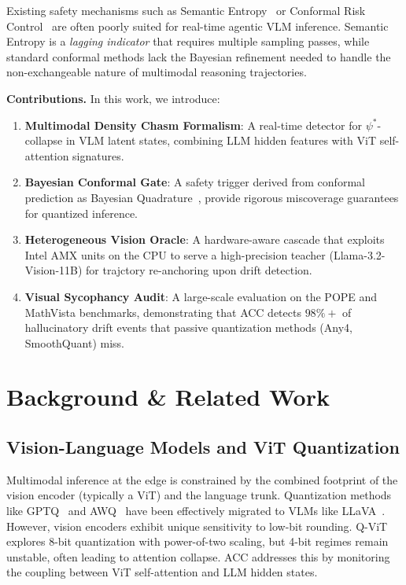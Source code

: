 \documentclass[runningheads]{article} %
\begin{document}
Existing safety mechanisms such as Semantic Entropy~\cite{kuhn2023semantic} or Conformal Risk Control~\cite{angelopoulos2024crc} are often poorly suited for real-time agentic VLM inference. Semantic Entropy is a \emph{lagging indicator} that requires multiple sampling passes, while standard conformal methods lack the Bayesian refinement needed to handle the non-exchangeable nature of multimodal reasoning trajectories.

\textbf{Contributions.} In this work, we introduce:
\begin{enumerate}
  \item \textbf{Multimodal Density Chasm Formalism}: A real-time detector for $\psi^*$-collapse in VLM latent states, combining LLM hidden features with ViT self-attention signatures.
  \item \textbf{Bayesian Conformal Gate}: A safety trigger derived from conformal prediction as Bayesian Quadrature~\cite{snell2025conformal}, provide rigorous miscoverage guarantees for quantized inference.
  \item \textbf{Heterogeneous Vision Oracle}: A hardware-aware cascade that exploits Intel AMX units on the CPU to serve a high-precision teacher (Llama-3.2-Vision-11B) for trajctory re-anchoring upon drift detection.
  \item \textbf{Visual Sycophancy Audit}: A large-scale evaluation on the POPE and MathVista benchmarks, demonstrating that ACC detects $98\%+$ of hallucinatory drift events that passive quantization methods (Any4, SmoothQuant) miss.
\end{enumerate}

\section{Background \& Related Work}
\label{sec:related}

\subsection{Vision-Language Models and ViT Quantization}
Multimodal inference at the edge is constrained by the combined footprint of the vision encoder (typically a ViT) and the language trunk. Quantization methods like GPTQ~\cite{frantar2022gptq} and AWQ~\cite{lin2023awq} have been effectively migrated to VLMs like LLaVA~\cite{liu2024llava16}. However, vision encoders exhibit unique sensitivity to low-bit rounding. Q-ViT~\cite{liu2023qvit} explores 8-bit quantization with power-of-two scaling, but 4-bit regimes remain unstable, often leading to attention collapse. ACC addresses this by monitoring the coupling between ViT self-attention and LLM hidden states.
\end{document}

